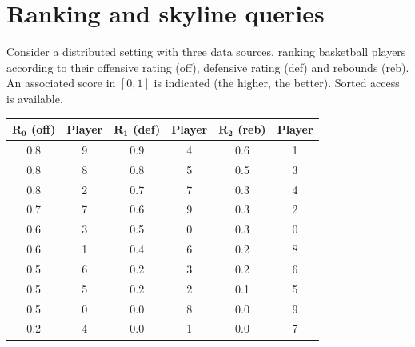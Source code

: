 \section{Ranking and skyline queries}

Consider a distributed setting with three data sources, ranking basketball players according to their offensive rating (off), defensive rating (def) and rebounds (reb).
An associated score in $[0,1]$ is indicated (the higher, the better). 
Sorted access is available.
\begin{table}[H]
    \centering
    \begin{tabular}{|cc|cc|cc|}
    \hline
    $\boldsymbol{R_0}$ \textbf{(off)} & \textbf{Player} & $\boldsymbol{R_1}$ \textbf{(def)} & \textbf{Player} & $\boldsymbol{R_2}$ \textbf{(reb)} & \textbf{Player} \\ \hline
    0.8         & 9      & 0.9         & 4      & 0.6         & 1      \\
    0.8         & 8      & 0.8         & 5      & 0.5         & 3      \\
    0.8         & 2      & 0.7         & 7      & 0.3         & 4      \\
    0.7         & 7      & 0.6         & 9      & 0.3         & 2      \\
    0.6         & 3      & 0.5         & 0      & 0.3         & 0      \\
    0.6         & 1      & 0.4         & 6      & 0.2         & 8      \\
    0.5         & 6      & 0.2         & 3      & 0.2         & 6      \\
    0.5         & 5      & 0.2         & 2      & 0.1         & 5      \\
    0.5         & 0      & 0.0         & 8      & 0.0         & 9      \\
    0.2         & 4      & 0.0         & 1      & 0.0         & 7      \\ \hline
    \end{tabular}
\end{table}
